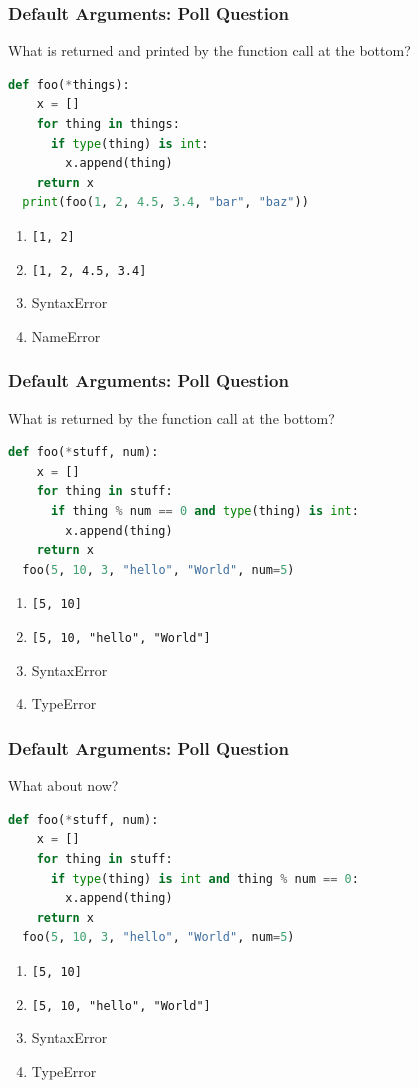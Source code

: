 \documentclass{beamer}
\begin{document}
%
%
\begin{frame}[fragile]
  \frametitle{Default Arguments: Poll Question}
  What is returned and printed by the function call at the bottom?
  \begin{lstlisting}[language=Python, autogobble]
  def foo(*things):
    x = []
    for thing in things:
      if type(thing) is int:
        x.append(thing)
    return x
  print(foo(1, 2, 4.5, 3.4, "bar", "baz"))    
  \end{lstlisting}
  \vfill
  \begin{enumerate}[A]
    \item \lstinline|[1, 2]|
    \item \lstinline|[1, 2, 4.5, 3.4]|
    \item SyntaxError
    \item NameError
  \end{enumerate}
\end{frame}


%
%
\begin{frame}[fragile]
  \frametitle{Default Arguments: Poll Question}
  What is returned by the function call at the bottom?
  \begin{lstlisting}[language=Python, autogobble]
  def foo(*stuff, num):
    x = []
    for thing in stuff:
      if thing % num == 0 and type(thing) is int:
        x.append(thing)
    return x
  foo(5, 10, 3, "hello", "World", num=5)
  \end{lstlisting}
  \vfill
  \begin{enumerate}[A]
    \item \lstinline|[5, 10]|
    \item \lstinline|[5, 10, "hello", "World"]|
    \item SyntaxError
    \item TypeError
  \end{enumerate}
\end{frame}

%
%
\begin{frame}[fragile]
  \frametitle{Default Arguments: Poll Question}
  What about now?
  \begin{lstlisting}[language=Python, autogobble]
  def foo(*stuff, num):
    x = []
    for thing in stuff:
      if type(thing) is int and thing % num == 0:
        x.append(thing)
    return x
  foo(5, 10, 3, "hello", "World", num=5)
  \end{lstlisting}
  \vfill
  \begin{enumerate}[A]
    \item \lstinline|[5, 10]|
    \item \lstinline|[5, 10, "hello", "World"]|
    \item SyntaxError
    \item TypeError
  \end{enumerate}
\end{frame}
\end{document}
